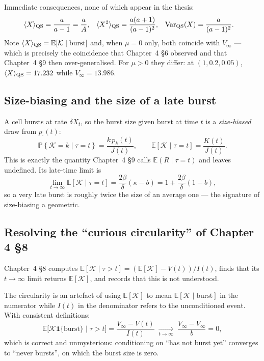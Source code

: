 \documentclass[11pt]{article}
\newcommand{\E}{\mathbb{E}}
\newcommand{\Prob}[1]{\mathbb{P}\!\left\{#1\right\}}
\newcommand{\xt}{X_t}
\newcommand{\Kb}{\mathcal{K}}
\newcommand{\Aa}{A}
\theoremstyle{plain}
\theoremstyle{definition}
\theoremstyle{remark}
\begin{document}
Immediate consequences, none of which appear in the thesis:
\begin{align}
\langle X\rangle_{\rm QS}&=\frac{a}{a-1}=\frac{a}{\Aa}, &
\langle X^2\rangle_{\rm QS}&=\frac{a(a+1)}{(a-1)^2}, &
\mathrm{Var}_{\rm QS}(X)&=\frac{a}{(a-1)^2}. \label{eq:QSmoments}
\end{align}
Note $\langle X\rangle_{\rm QS}=\E[\Kb\mid\text{burst}]$ and, when $\mu=0$ only,
both coincide with $V_\infty$ --- which is precisely the coincidence that Chapter~4 \S6
observed and that Chapter~4 \S9 then over-generalised. For $\mu>0$ they differ:
at $(1,0.2,0.05)$, $\langle X\rangle_{\rm QS}=17.232$ while $V_\infty=13.986$.

\subsection{Size-biasing and the size of a late burst}

A cell bursts at rate $\delta\xt$, so the burst size given burst at time $t$ is a
\emph{size-biased} draw from $p_\cdot(t)$:
\begin{equation}
\Prob{\Kb=k\mid\tau=t}=\frac{k\,p_k(t)}{J(t)},\qquad
\E[\Kb\mid\tau=t]=\frac{K(t)}{J(t)}.
\end{equation}
This is exactly the quantity Chapter~4 \S9 calls $\E(R\mid\tau=t)$ and leaves undefined.
Its late-time limit is
\begin{equation}
\lim_{t\to\infty}\E[\Kb\mid\tau=t]=\frac{2\beta}{\delta}(\kappa-b)=1+\frac{2\beta}{\delta}(1-b),
\end{equation}
so a very late burst is roughly twice the size of an average one --- the signature of
size-biasing a geometric.

\subsection{Resolving the ``curious circularity'' of Chapter 4 \S8}

Chapter~4 \S8 computes $\E[\Kb\mid\tau>t]=(\E[\Kb]-V(t))/I(t)$, finds that its
$t\to\infty$ limit returns $\E[\Kb]$, and records that this is not understood.

The circularity is an artefact of using $\E[\Kb]$ to mean $\E[\Kb\mid\text{burst}]$
in the numerator while $I(t)$ in the denominator refers to the unconditioned event.
With consistent definitions:
\begin{equation}
\E\bigl[\Kb\mathbf 1\{\text{burst}\}\mid\tau>t\bigr]=\frac{V_\infty-V(t)}{I(t)}
\;\xrightarrow[t\to\infty]{}\;\frac{V_\infty-V_\infty}{b}=0,
\end{equation}
which is correct and unmysterious: conditioning on ``has not burst yet'' converges to
``never bursts'', on which the burst size is zero.
\end{document}
